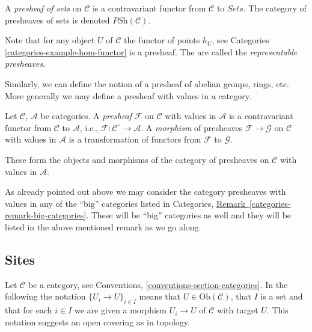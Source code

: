 \begin{definition}
\label{definition-presheaves-sets}
A {\it presheaf of sets} on $\mathcal{C}$ is a contravariant
functor from $\mathcal{C}$ to $\textit{Sets}$. The category
of presheaves of sets is denoted $\textit{PSh}(\mathcal{C})$.
\end{definition}

\noindent
Note that for any object $U$ of $\mathcal{C}$ the functor of
points $h_U$, see Categories \autoref{categories-example-hom-functor}
is a presheaf. The are called the {\it representable presheaves}.

\medskip\noindent
Similarly, we can define the notion of a presheaf of abelian groups,
rings, etc. More generally we may define a presheaf with values in a
category.

\begin{definition}
\label{definition-presheaf}
Let $\mathcal{C}$, $\mathcal{A}$ be categories.
A {\it presheaf} $\mathcal{F}$ on $\mathcal{C}$
with values in $\mathcal{A}$ is a contravariant
functor from $\mathcal{C}$ to $\mathcal{A}$,
i.e., $\mathcal{F} : \mathcal{C}^\circ \to \mathcal{A}$.
A {\it morphism} of presheaves $\mathcal{F} \to \mathcal{G}$
on $\mathcal{C}$ with values in $\mathcal{A}$ is a transformation
of functors from $\mathcal{F}$ to $\mathcal{G}$.
\end{definition}

\noindent
These form the objects and morphisms of the category of presheaves
on $\mathcal{C}$ with values in $\mathcal{A}$.

\begin{remark}
\label{remark-big-presheaves}
As already pointed out above we may consider the category
presheaves with values in any of the ``big'' categories
listed in Categories, \hyperref[categories-remark-big-categories]%
{Remark~\ref*{categories-remark-big-categories}}.
These will be ``big'' categories as well and they will be
listed in the above mentioned remark as we go along.
\end{remark}

\subsection{Sites}
\label{subsection-sites-definitions}

\noindent
Let $\mathcal{C}$ be a category, see
Conventions, \autoref{conventions-section-categories}. 
In the following the notation $\{U_i \to U\}_{i\in I}$ means that 
$U \in \text{Ob}(\mathcal{C})$, that $I$ is a set and that for each $i\in I$ 
we are given a morphism $U_i \to U$ of $\mathcal{C}$ with target $U$. This
notation suggests an open covering as in topology.

